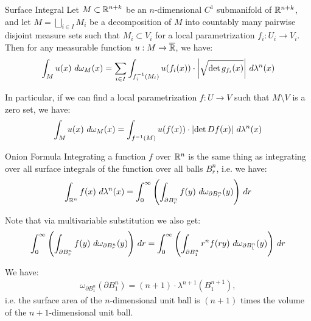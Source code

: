\begin{importanttheorem}{Surface Integral}{}
	Let $M \subset \mathbb{R}^{n+k}$ be an $n$-dimensional $C^1$ submanifold of $\mathbb{R}^{n+k}$, and let $M = \bigsqcup_{i \in I} M_i$ be a decomposition of $M$ into countably many pairwise disjoint measure sets such that $M_i \subset V_i$ for a local parametrization $f_i : U_i \to V_i$. Then for any measurable function $u : M \to \overline{{\mathbb{R}}}$, we have:
	\begin{align*}
		\int_M u(x) ~d\omega_M(x) = \sum_{i \in I} \int_{f_i^{-1}(M_i)} u(f_i(x)) \cdot \abs{\sqrt{\det g_{f_i}(x)}} ~d\lambda^n(x)
	\end{align*}
\end{importanttheorem}
In particular, if we can find a local parametrization $f : U \to V$ such that $M \setminus V$ is a zero set, we have:
\begin{align*}
	\int_M u(x) ~d\omega_M(x) = \int_{f^{-1}(M)} u(f(x)) \cdot \abs{\det Df(x)} ~d\lambda^n(x)
\end{align*}
\begin{importanttheorem}{Onion Formula}{}
	Integrating a function $f$ over $\mathbb{R}^n$ is the same thing as integrating over all surface integrals of the function over all balls $B_r^n$, i.e. we have:
	\begin{align*}
		\int_{\mathbb{R}^n} f(x) ~d\lambda^n(x) 
		= \int_{0}^{\infty} \qty( \int_{\partial B_r^n} f(y) ~d\omega_{\partial B_r^n}(y)) ~dr
	\end{align*}
\end{importanttheorem}
Note that via multivariable substitution we also get:
\begin{align*}
	\int_{0}^{\infty} \qty( \int_{\partial B_r^n} f(y) ~d\omega_{\partial B_r^n}(y)) ~dr
	= \int_{0}^{\infty} \qty( \int_{\partial B_1^n} r^n f(ry) ~d\omega_{\partial B_1^n}(y)) ~dr
\end{align*}
\begin{corollary}
	We have:
	\begin{align*}
		\omega_{\partial B_1^n}(\partial B_1^n) = (n+1) \cdot \lambda^{n+1}(B_1^{n+1}),
	\end{align*}
	i.e. the surface area of the $n$-dimensional unit ball is $(n+1)$ times the volume of the $n+1$-dimensional unit ball.
\end{corollary}
